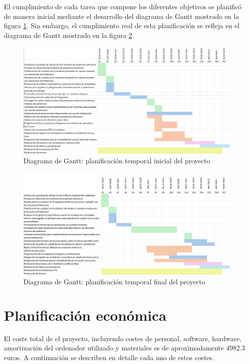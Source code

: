 El cumplimiento de cada tarea que compone los diferentes objetivos se planificó de manera inicial mediante el desarrollo del diagrama de Gantt mostrado en la figura \ref{fig:Diagramagantt}. Sin embargo, el cumplimiento real de esta planificación se refleja en el diagrama de Gantt mostrado en la figura \ref{fig:Diagramagantt2}.

\begin{figure}
    \centering
    \includegraphics[width=1\textwidth]{img/gant1.png}
    \caption{Diagrama de Gantt: planificación temporal inicial del proyecto}
    \label{fig:Diagramagantt}
\end{figure}

\begin{figure}
    \centering
    \includegraphics[width=1\textwidth]{img/gant2.png}
    \caption{Diagrama de Gantt: planificación temporal final del proyecto}
    \label{fig:Diagramagantt2}
\end{figure}

\section{Planificación económica}
El coste total de el proyecto, incluyendo costes de personal, software, hardware, amortización del ordenador utilizado y materiales es de aproximadamente 4982.3 euros. A continuación se describen en detalle cada uno de estos costes.
